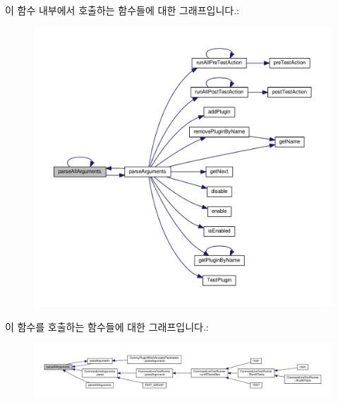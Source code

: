 이 함수 내부에서 호출하는 함수들에 대한 그래프입니다.\+:
\nopagebreak
\begin{figure}[H]
\begin{center}
\leavevmode
\includegraphics[width=350pt]{class_test_plugin_acfa2bcea2c98a16cb7d2a8f177bb84b9_cgraph}
\end{center}
\end{figure}




이 함수를 호출하는 함수들에 대한 그래프입니다.\+:
\nopagebreak
\begin{figure}[H]
\begin{center}
\leavevmode
\includegraphics[width=350pt]{class_test_plugin_acfa2bcea2c98a16cb7d2a8f177bb84b9_icgraph}
\end{center}
\end{figure}


